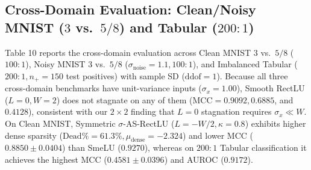 \documentclass[11pt, a4paper]{article}
\begin{document}
\subsection{Cross-Domain Evaluation: Clean/Noisy MNIST ($3$ vs.\ $5/8$) and Tabular ($200:1$)}
Table 10 reports the cross-domain evaluation across Clean MNIST $3$ vs.\ $5/8$ ($100:1$), Noisy MNIST $3$ vs.\ $5/8$ ($\sigma_{\text{noise}} = 1.1, 100:1$), and Imbalanced Tabular ($200:1, n_{+} = 150$ test positives) with sample SD ($\text{ddof}=1$). Because all three cross-domain benchmarks have unit-variance inputs ($\sigma_{x} = 1.00$), Smooth RectLU ($L=0, W=2$) does not stagnate on any of them ($\text{MCC} = 0.9092, 0.6885$, and $0.4128$), consistent with our $2 \times 2$ finding that $L=0$ stagnation requires $\sigma_{x} \ll W$. On Clean MNIST, Symmetric $\sigma$-AS-RectLU ($L=-W/2, \kappa=0.8$) exhibits higher dense sparsity ($\text{Dead}\% = 61.3\%, \mu_{\text{dense}} = -2.324$) and lower MCC ($0.8850 \pm 0.0404$) than SmeLU ($0.9270$), whereas on $200:1$ Tabular classification it achieves the highest MCC ($0.4581 \pm 0.0396$) and AUROC ($0.9172$).
\end{document}
